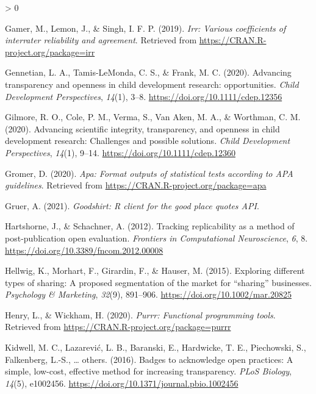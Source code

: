 \documentclass[
  english,
  man,floatsintext]{apa6}
\newlength{\cslhangindent}
\newenvironment{CSLReferences}[2] %
 {%
  \setlength{\parindent}{0pt}
  \ifodd #1 \everypar{\setlength{\hangindent}{\cslhangindent}}\ignorespaces\fi
  \ifnum #2 > 0
  \setlength{\parskip}{#2\baselineskip}
  \fi
 }%
 {}
\begin{document}
\begin{CSLReferences}{1}{0}
\leavevmode\hypertarget{ref-R-irr}{}%
Gamer, M., Lemon, J., \& Singh, I. F. P. (2019). \emph{Irr: Various coefficients of interrater reliability and agreement}. Retrieved from \url{https://CRAN.R-project.org/package=irr}

\leavevmode\hypertarget{ref-gennetian2020advancing}{}%
Gennetian, L. A., Tamis-LeMonda, C. S., \& Frank, M. C. (2020). Advancing transparency and openness in child development research: opportunities. \emph{Child Development Perspectives}, \emph{14}(1), 3--8. \url{https://doi.org/10.1111/cdep.12356}

\leavevmode\hypertarget{ref-gilmore2020advancing}{}%
Gilmore, R. O., Cole, P. M., Verma, S., Van Aken, M. A., \& Worthman, C. M. (2020). Advancing scientific integrity, transparency, and openness in child development research: Challenges and possible solutions. \emph{Child Development Perspectives}, \emph{14}(1), 9--14. \url{https://doi.org/10.1111/cdep.12360}

\leavevmode\hypertarget{ref-R-apa}{}%
Gromer, D. (2020). \emph{Apa: Format outputs of statistical tests according to APA guidelines}. Retrieved from \url{https://CRAN.R-project.org/package=apa}

\leavevmode\hypertarget{ref-R-goodshirt}{}%
Gruer, A. (2021). \emph{Goodshirt: R client for the good place quotes API}.

\leavevmode\hypertarget{ref-hartshorne2012tracking}{}%
Hartshorne, J., \& Schachner, A. (2012). Tracking replicability as a method of post-publication open evaluation. \emph{Frontiers in Computational Neuroscience}, \emph{6}, 8. \url{https://doi.org/10.3389/fncom.2012.00008}

\leavevmode\hypertarget{ref-hellwig2015exploring}{}%
Hellwig, K., Morhart, F., Girardin, F., \& Hauser, M. (2015). Exploring different types of sharing: A proposed segmentation of the market for {``sharing''} businesses. \emph{Psychology \& Marketing}, \emph{32}(9), 891--906. \url{https://doi.org/10.1002/mar.20825}

\leavevmode\hypertarget{ref-R-purrr}{}%
Henry, L., \& Wickham, H. (2020). \emph{Purrr: Functional programming tools}. Retrieved from \url{https://CRAN.R-project.org/package=purrr}

\leavevmode\hypertarget{ref-kidwell2016badges}{}%
Kidwell, M. C., Lazarević, L. B., Baranski, E., Hardwicke, T. E., Piechowski, S., Falkenberg, L.-S., \ldots{} others. (2016). Badges to acknowledge open practices: A simple, low-cost, effective method for increasing transparency. \emph{PLoS Biology}, \emph{14}(5), e1002456. \url{https://doi.org/10.1371/journal.pbio.1002456}


\end{CSLReferences}
\end{document}
